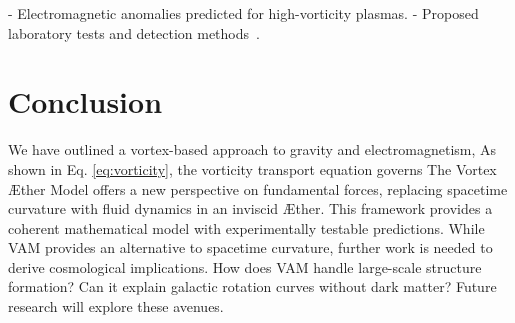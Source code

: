\documentclass[a4paper,10pt]{article}
\begin{document}
    - Electromagnetic anomalies predicted for high-vorticity plasmas.
    - Proposed laboratory tests and detection methods~\cite{kleckner2013, vinen2024, podkletnov2007, orlandi2021}.

    \section{Conclusion}\label{sec:conclusion}
    We have outlined a vortex-based approach to gravity and electromagnetism, As shown in Eq. \eqref{eq:vorticity}, the vorticity transport equation governs  The Vortex \AE ther Model offers a new perspective on fundamental forces,
    replacing spacetime curvature with fluid dynamics in an inviscid \AE ther.
    This framework provides a coherent mathematical model with experimentally testable predictions.
    While VAM provides an alternative to spacetime curvature, further work is needed to derive cosmological implications.
    How does VAM handle large-scale structure formation?
    Can it explain galactic rotation curves without dark matter?
    Future research will explore these avenues.
\end{document}
